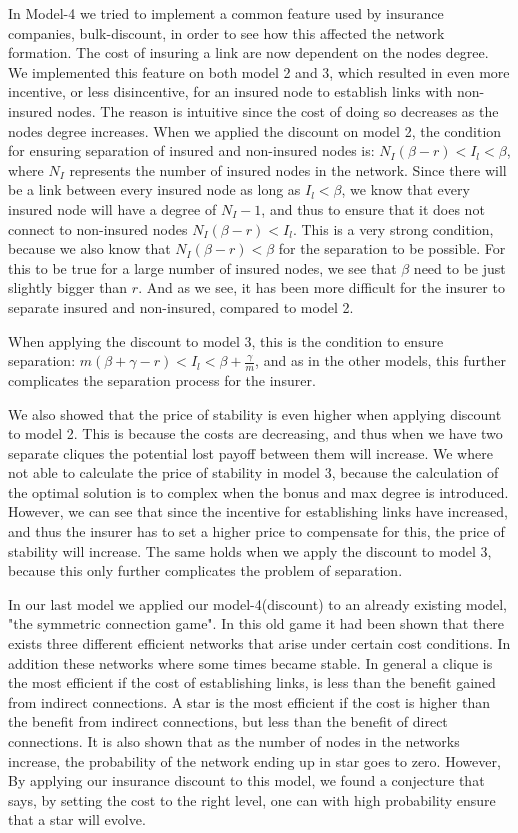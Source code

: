 In Model-4 we tried to implement a common feature used by insurance companies, bulk-discount, in order to see how this affected the network formation. The cost of insuring a link are now dependent on the nodes degree. We implemented this feature on both model 2 and 3, which resulted in even more incentive, or less disincentive, for an insured node to establish links with non-insured nodes. The reason is intuitive since the cost of doing so decreases as the nodes degree increases. 
When we applied the discount on model 2, the condition for ensuring separation of insured and non-insured nodes is: $N_{I}(\beta-r)<I_{l}<\beta$, where $N_{I}$ represents the number of insured nodes in the network. Since there will be a link between every insured node as long as $I_{l}<\beta$, we know that every insured node will have a degree of $N_{I}-1$, and thus to ensure that it does not connect to non-insured nodes $N_{I}(\beta-r)<I_{l}$. This is a very strong condition, because we also know that $N_{I}(\beta-r)<\beta$ for the separation to be possible. For this to be true for a large number of insured nodes, we see that $\beta$ need to be just slightly bigger than $r$. And as we see, it has been more difficult for the insurer to separate insured and non-insured, compared to model 2.

When applying the discount to model 3, this is the condition to ensure separation: $m(\beta+\gamma-r)<I_{l}<\beta+\frac{\gamma}{m}$, and as in the other models, this further complicates the separation process for the insurer. 

We also showed that the price of stability is even higher when applying discount to model 2. This is because the costs are decreasing, and thus when we have two separate cliques the potential lost payoff between them will increase.
We where not able to calculate the price of stability in model 3, because the calculation of the optimal solution is to complex when the bonus and max degree is introduced. However, we can see that since the incentive for establishing links have increased, and thus the insurer has to set a higher price to compensate for this, the price of stability will increase. The same holds when we apply the discount to model 3, because this only further complicates the problem of separation.  

In our last model we applied our model-4(discount) to an already existing model, "the symmetric connection game". In this old game it had been shown that there exists three different efficient networks that arise under certain cost conditions. In addition these networks where some times became stable. In general a clique is the most efficient if the cost of establishing links, is less than the benefit gained from indirect connections. A star is the most efficient if the cost is higher than the benefit from indirect connections, but less than the benefit of direct connections. 
It is also shown that as the number of nodes in the networks increase, the probability of the network ending up in star goes to zero. However, By applying our insurance discount to this model, we found a conjecture that says, by setting the cost to the right level, one can with high probability ensure that a star will evolve. 



